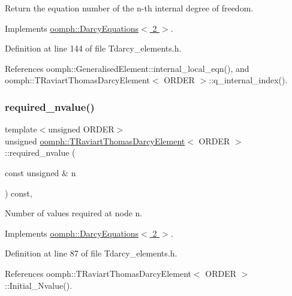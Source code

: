 Return the equation number of the n-\/th internal degree of freedom. 



Implements \hyperlink{classoomph_1_1DarcyEquations_a17e99902b01ea42312fa6148a796255f}{oomph\+::\+Darcy\+Equations$<$ 2 $>$}.



Definition at line 144 of file Tdarcy\+\_\+elements.\+h.



References oomph\+::\+Generalised\+Element\+::internal\+\_\+local\+\_\+eqn(), and oomph\+::\+T\+Raviart\+Thomas\+Darcy\+Element$<$ O\+R\+D\+E\+R $>$\+::q\+\_\+internal\+\_\+index().

\mbox{\label{classoomph_1_1TRaviartThomasDarcyElement_a35bdfb84cea500e383c72cedfe09f933}} 
\subsubsection{\texorpdfstring{required\+\_\+nvalue()}{required\_nvalue()}}
{\footnotesize\ttfamily template$<$unsigned O\+R\+D\+ER$>$ \\
unsigned \hyperlink{classoomph_1_1TRaviartThomasDarcyElement}{oomph\+::\+T\+Raviart\+Thomas\+Darcy\+Element}$<$ O\+R\+D\+ER $>$\+::required\+\_\+nvalue (\begin{DoxyParamCaption}\item[{const unsigned \&}]{n }\end{DoxyParamCaption}) const\hspace{0.3cm}{\ttfamily [inline]}, {\ttfamily [virtual]}}



Number of values required at node n. 



Implements \hyperlink{classoomph_1_1DarcyEquations_a05d86d0d0568c5f90e6d735730798571}{oomph\+::\+Darcy\+Equations$<$ 2 $>$}.



Definition at line 87 of file Tdarcy\+\_\+elements.\+h.



References oomph\+::\+T\+Raviart\+Thomas\+Darcy\+Element$<$ O\+R\+D\+E\+R $>$\+::\+Initial\+\_\+\+Nvalue().

